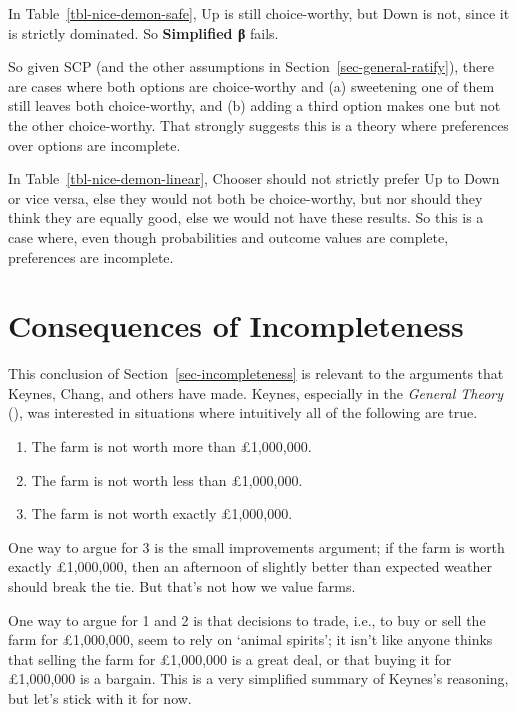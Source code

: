 \documentclass[
  11pt,
  letterpaper,
  DIV=11,
  numbers=noendperiod,
  twoside]{scrartcl}
\providecommand{\tightlist}{%
  \setlength{\itemsep}{0pt}\setlength{\parskip}{0pt}}
\begin{document}
In Table~\ref{tbl-nice-demon-safe}, Up is still choice-worthy, but Down
is not, since it is strictly dominated. So \textbf{Simplified β} fails.

So given SCP (and the other assumptions in
Section~\ref{sec-general-ratify}), there are cases where both options
are choice-worthy and (a) sweetening one of them still leaves both
choice-worthy, and (b) adding a third option makes one but not the other
choice-worthy. That strongly suggests this is a theory where preferences
over options are incomplete.

In Table~\ref{tbl-nice-demon-linear}, Chooser should not strictly prefer
Up to Down or vice versa, else they would not both be choice-worthy, but
nor should they think they are equally good, else we would not have
these results. So this is a case where, even though probabilities and
outcome values are complete, preferences are incomplete.

\section{Consequences of
Incompleteness}\label{consequences-of-incompleteness}

This conclusion of Section~\ref{sec-incompleteness} is relevant to the
arguments that Keynes, Chang, and others have made. Keynes, especially
in the \emph{General Theory} (),
was interested in situations where intuitively all of the following are
true.

\begin{enumerate}
\def\labelenumi{\arabic{enumi}.}
\tightlist
\item
  The farm is not worth more than £1,000,000.
\item
  The farm is not worth less than £1,000,000.
\item
  The farm is not worth exactly £1,000,000.
\end{enumerate}

One way to argue for 3 is the small improvements argument; if the farm
is worth exactly £1,000,000, then an afternoon of slightly better than
expected weather should break the tie. But that's not how we value
farms.

One way to argue for 1 and 2 is that decisions to trade, i.e., to buy or
sell the farm for £1,000,000, seem to rely on `animal spirits'; it isn't
like anyone thinks that selling the farm for £1,000,000 is a great deal,
or that buying it for £1,000,000 is a bargain. This is a very simplified
summary of Keynes's reasoning, but let's stick with it for now.
\end{document}
